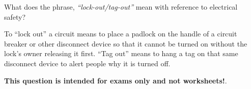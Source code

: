 

What does the phrase, {\it ``lock-out/tag-out''} mean with reference to electrical safety?







To ``lock out'' a circuit means to place a padlock on the handle of a circuit breaker or other disconnect device so that it cannot be turned on without the lock's owner releasing it first.  ``Tag out'' means to hang a tag on that same disconnect device to alert people why it is turned off.







{\bf This question is intended for exams only and not worksheets!}.



